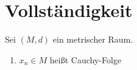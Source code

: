 
\chapter{Vollst{\"a}ndigkeit}

\begin{definition}
	Sei $(M, d)$ ein metrischer Raum.
	\begin{enumerate}[label=\alph*\upshape)]
		\item $x_{n} \in M$ hei{\ss}t Cauchy-Folge	
	\end{enumerate}
\end{definition}

\newpage






























